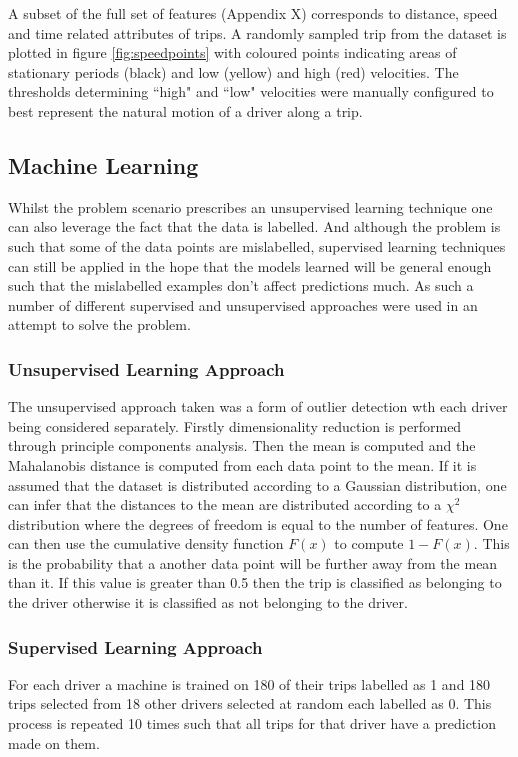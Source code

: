 \documentclass[a4paper, 11pt, twocolumn]{report}
\begin{document}

A subset of the full set of features (Appendix X) corresponds to distance, speed and time related attributes of trips.
A randomly sampled trip from the dataset is plotted in figure \ref{fig:speedpoints} with coloured points indicating areas of stationary periods (black) and low (yellow) and high (red) velocities.
The thresholds determining ``high" and ``low" velocities were manually configured to best represent the natural motion of a driver along a trip.




\subsection{Machine Learning}
Whilst the problem scenario prescribes an unsupervised learning technique one can also leverage the fact that the data is labelled.
And although the problem is such that some of the data points are mislabelled, supervised learning techniques can still be applied in the hope that the models learned will be general enough such that the mislabelled examples don't affect predictions much.
As such a number of different supervised and unsupervised approaches were used in an attempt to solve the problem.

\subsubsection{Unsupervised Learning Approach}
The unsupervised approach taken was a form of outlier detection wth each driver being considered separately. Firstly dimensionality reduction is performed through principle components analysis. Then the mean is computed and the Mahalanobis distance is computed from each data point to the mean. If it is assumed that the dataset is distributed according to a Gaussian distribution, one can infer that the distances to the mean are distributed according to a $\chi^2$ distribution where the degrees of freedom is equal to the number of features. One can then use the cumulative density function $F(x)$ to compute $1 - F(x)$. This is the probability that a another data point will be further away from the mean than it. If this value is greater than 0.5 then the trip is classified as belonging to the driver otherwise it is classified as not belonging to the driver.

\subsubsection{Supervised Learning Approach}
For each driver a machine is trained on 180 of their trips labelled as 1 and 180 trips selected from 18 other drivers selected at random each labelled as 0. This process is repeated 10 times such that all trips for that driver have a prediction made on them. 
\end{document}
